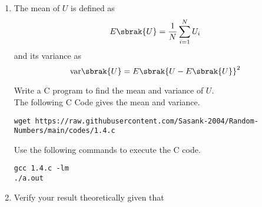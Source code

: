 \documentclass[journal,12pt,twocolumn]{IEEEtran}
\renewcommand\thesection{\arabic{section}}
\begin{document}
\begin{enumerate}[label=\thesection.\arabic*
,ref=\thesection.\theenumi]
\begin{equation}
\end{equation}
We Know That 
\begin{align}
    F_U(x) &=  \int_{-\infty}^{x} p_U(x)dx  \\
    \Rightarrow F_U(x) &= 
    \begin{cases}
    0 & x < 0 \\
    \int_{0}^{x} 1dx &  0 \le x \le 1 \\
    \int_{0}^{1} 1dx & x > 1 
    \end{cases} \\
    \Rightarrow F_U(x) &= 
    \begin{cases}
    0 & x < 0 \\
    x &  0 \le x \le 1 \\
    1 & x > 1 
    \end{cases} 
\end{align}
\item
The mean of $U$ is defined as
%
\begin{equation}
E\sbrak{U} = \frac{1}{N}\sum_{i=1}^{N}U_i
\end{equation}
%
and its variance as
%
\begin{equation}
\text{var}\sbrak{U} = E\sbrak{U- E\sbrak{U}}^2 
\end{equation}

Write a C program to  find the mean and variance of $U$. \\
\solution The following C Code gives the mean and variance. 
\begin{lstlisting}
wget https://raw.githubusercontent.com/Sasank-2004/Random-Numbers/main/codes/1.4.c
\end{lstlisting}
Use the following commands to execute the C code.
\begin{lstlisting}
gcc 1.4.c -lm
./a.out
\end{lstlisting}
\item Verify your result theoretically given that


\end{enumerate}
\end{document}
